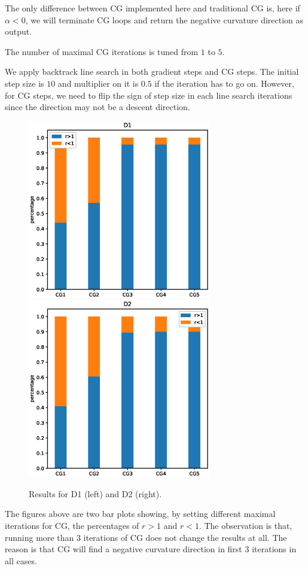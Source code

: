 \documentclass[12pt]{article}
\begin{document}
The only difference between CG implemented here and traditional CG is, here if $\alpha<0$, we will terminate CG loops and return the negative curvature direction as output. 

The number of maximal CG iterations is tuned from $1$ to $5$.

We apply backtrack line search in both gradient steps and CG steps. The initial step size is $10$ and multiplier on it is $0.5$ if the iteration has to go on. However, for CG steps, we need to flip the sign of step size in each line search iterations since the direction may not be a descent direction. 
 
\begin{figure}[h]
\includegraphics[width=8cm]{CGD1.eps}
\includegraphics[width=8cm]{CGD2.eps}
\caption{Results for D1 (left) and D2 (right).}
\label{fig:CGvsGD}
\end{figure}

The figures above are two bar plots showing, by setting different maximal iterations for CG, the percentages of $r>1$ and $r<1$. The observation is that, running more than $3$ iterations of CG does not change the results at all. The reason is that CG will find a negative curvature direction in first $3$ iterations in all cases. 
\end{document}
